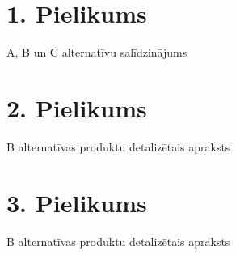 
\begin{appendices}
    \chapter*{1. Pielikums}
        A, B un C alternatīvu salīdzinājums
        \clearpage
    \chapter*{2. Pielikums}
        B alternatīvas produktu detalizētais apraksts
        \clearpage
    \chapter*{3. Pielikums}
        B alternatīvas produktu detalizētais apraksts
        \clearpage
\end{appendices}
